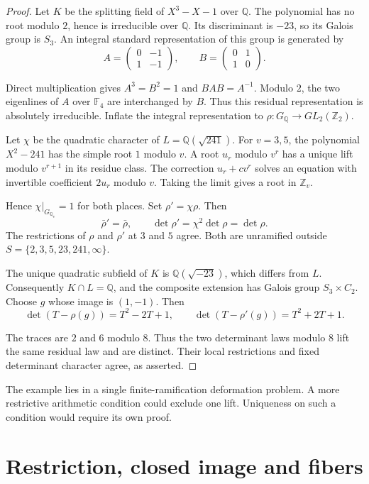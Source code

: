 \begin{proof}
Let $K$ be the splitting field of $X^3-X-1$ over $\mathbb Q$.
The polynomial has no root modulo $2$, hence is irreducible over
$\mathbb Q$. Its discriminant is $-23$, so its Galois group is
$S_3$. An integral standard representation of this group is generated
by
\[
 A=\begin{pmatrix}0&-1\\1&-1\end{pmatrix},\qquad
 B=\begin{pmatrix}0&1\\1&0\end{pmatrix}.
\]

Direct multiplication gives $A^3=B^2=1$ and $BAB=A^{-1}$.
Modulo $2$, the two eigenlines of $A$ over $\mathbb F_4$ are
interchanged by $B$. Thus this residual representation is absolutely
irreducible. Inflate the integral representation to
$\rho:G_{\mathbb Q}\to GL_2(\mathbb Z_2)$.

Let $\chi$ be the quadratic character of
$L=\mathbb Q(\sqrt{241})$.
For $v=3,5$, the polynomial $X^2-241$ has the simple root $1$
modulo $v$. A root $u_r$ modulo $v^r$ has a unique lift modulo $v^{r+1}$
in its residue class. The correction $u_r+c v^r$ solves an
equation with invertible coefficient $2u_r$ modulo $v$.
Taking the limit gives a root in $\mathbb Z_v$.

Hence $\chi|_{G_{\mathbb Q_v}}=1$ for both places.
Set $\rho'=\chi\rho$. Then
\[
 \bar\rho'=\bar\rho,\qquad
 \det\rho'=\chi^2\det\rho=\det\rho.
\]
The restrictions of $\rho$ and $\rho'$ at $3$ and $5$ agree.
Both are unramified outside
$S=\{2,3,5,23,241,\infty\}$.

The unique quadratic subfield of $K$ is $\mathbb Q(\sqrt{-23})$,
which differs from $L$. Consequently $K\cap L=\mathbb Q$, and
the composite extension has Galois group $S_3\times C_2$.
Choose $g$ whose image is $(1,-1)$. Then
\[
 \det(T-\rho(g))=T^2-2T+1,\qquad
 \det(T-\rho'(g))=T^2+2T+1.
\]

The traces are $2$ and $6$ modulo $8$.
Thus the two determinant laws modulo $8$ lift the same residual
law and are distinct. Their local restrictions and fixed determinant
character agree, as asserted.
\end{proof}

The example lies in a single finite-ramification deformation problem.
A more restrictive arithmetic condition could exclude one lift.
Uniqueness on such a condition would require its own proof.

\section{Restriction, closed image and fibers}
\label{v4-arith:ic:bcglue-core:prismatic}

